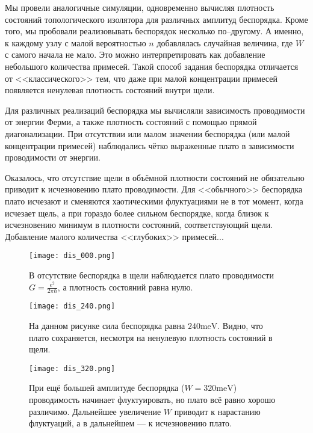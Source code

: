 Мы провели аналогичные симуляции, одновременно вычисляя плотность состояний топологического
изолятора для различных амплитуд беспорядка. Кроме того, мы пробовали реализовывать 
беспорядок несколько по--другому. А именно, к каждому узлу с малой 
вероятностью $n$ добавлялась случайная величина, где $W$ с самого начала не мало. Это можно
интерпретировать как добавление небольшого количества примесей. Такой способ задания беспорядка
отличается от <<классического>> тем, что даже при малой концентрации примесей появляется
ненулевая плотность состояний внутри щели. 

Для различных реализаций беспорядка мы вычисляли зависимость проводимости от энергии Ферми, а
также плотность состояний с помощью прямой диагонализации. При отсутствии или малом значении 
беспорядка (или малой концентрации примесей) наблюдались 
чётко выраженные плато в зависимости проводимости от энергии.

Оказалось, что отсутствие щели в объёмной плотности состояний не обязательно приводит 
к исчезновению плато проводимости. Для <<обычного>> беспорядка плато исчезают
и сменяются хаотическими флуктуациями не в тот момент, когда исчезает щель, а при гораздо
более сильном беспорядке, когда близок к исчезновению минимум в плотности состояний,
соответствующий щели. Добавление малого количества <<глубоких>> примесей...
\begin{figure}[h]
    \centering
    \texttt{[image: dis\_000.png]}
    \caption{В отсутствие беспорядка 
             в щели наблюдается плато проводимости $G = \frac{e^2}{2\pi\hbar}$, 
             а плотность состояний равна нулю. 
             }
\end{figure}

\begin{figure}[h]
    \centering
    \texttt{[image: dis\_240.png]}
    \caption{На данном рисунке сила беспорядка равна $240 \mathrm{meV}$. Видно, что плато 
             сохраняется, несмотря на ненулевую плотность состояний в щели.}
\end{figure}

\begin{figure}[h]
    \centering
    \texttt{[image: dis\_320.png]}
    \caption{При ещё большей амплитуде беспорядка ($W = 320\mathrm{meV}$) проводимость начинает
             флуктуировать, но плато всё равно хорошо различимо. Дальнейшее увеличение $W$ 
             приводит к нарастанию флуктуаций, а в дальнейшем --- к исчезновению плато.}
\end{figure}

%
\clearpage

